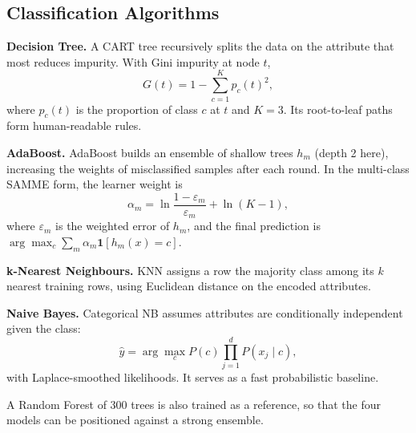 \documentclass[conference]{IEEEtran}
\begin{document}
\subsection{Classification Algorithms}
\textbf{Decision Tree.} A CART tree \cite{breiman1984} recursively splits the data on the attribute that most reduces impurity. With Gini impurity at node $t$,
\begin{equation}
G(t) = 1 - \sum_{c=1}^{K} p_c(t)^2,
\end{equation}
where $p_c(t)$ is the proportion of class $c$ at $t$ and $K = 3$. Its root-to-leaf paths form human-readable rules.

\textbf{AdaBoost.} AdaBoost \cite{freund1997} builds an ensemble of shallow trees $h_m$ (depth 2 here), increasing the weights of misclassified samples after each round. In the multi-class SAMME form, the learner weight is
\begin{equation}
\alpha_m = \ln\frac{1-\varepsilon_m}{\varepsilon_m} + \ln(K-1),
\end{equation}
where $\varepsilon_m$ is the weighted error of $h_m$, and the final prediction is $\arg\max_c \sum_m \alpha_m \mathbf{1}[h_m(x) = c]$.

\textbf{k-Nearest Neighbours.} KNN \cite{cover1967} assigns a row the majority class among its $k$ nearest training rows, using Euclidean distance on the encoded attributes.

\textbf{Naive Bayes.} Categorical NB assumes attributes are conditionally independent given the class:
\begin{equation}
\hat{y} = \arg\max_c P(c) \prod_{j=1}^{d} P(x_j \mid c),
\end{equation}
with Laplace-smoothed likelihoods. It serves as a fast probabilistic baseline.

A Random Forest \cite{breiman2001} of 300 trees is also trained as a reference, so that the four models can be positioned against a strong ensemble.
\end{document}
